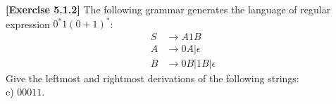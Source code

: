 \textbf{[Exercise 5.1.2]} The following grammar generates the language of regular 
expression $0^*1(0+1)^*$:
\begin{align*}
    S &\rightarrow A1B\\
    A &\rightarrow 0A|\epsilon\\
    B &\rightarrow 0B|1B|\epsilon
\end{align*}
Give the leftmost and rightmost derivations of the following strings:\\
c) $00011$.